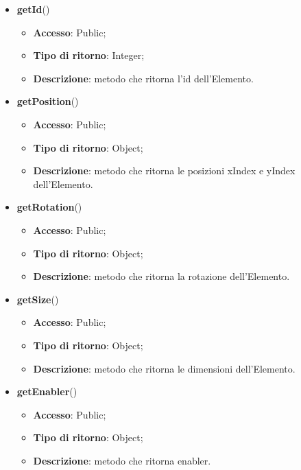 {{{\begin{itemize}
\begin{itemize}
				\item \textbf{Tipo di ritorno}: Void;
				\item \textbf{Descrizione}: metodo che ritorna executed.
			\end{itemize}
			\item \textbf{getId}()
			\begin{itemize}
				\item \textbf{Accesso}: Public;
				\item \textbf{Tipo di ritorno}: Integer;
				\item \textbf{Descrizione}: metodo che ritorna l'id dell'Elemento.
			\end{itemize}
			\item \textbf{getPosition}()
			\begin{itemize}
				\item \textbf{Accesso}: Public;
				\item \textbf{Tipo di ritorno}: Object;
				\item \textbf{Descrizione}: metodo che ritorna le posizioni xIndex e yIndex dell'Elemento.
			\end{itemize}
			\item \textbf{getRotation}()
			\begin{itemize}
				\item \textbf{Accesso}: Public;
				\item \textbf{Tipo di ritorno}: Object;
				\item \textbf{Descrizione}: metodo che ritorna la rotazione dell'Elemento.
			\end{itemize}
			\item \textbf{getSize}()
			\begin{itemize}
				\item \textbf{Accesso}: Public;
				\item \textbf{Tipo di ritorno}: Object;
				\item \textbf{Descrizione}: metodo che ritorna le dimensioni dell'Elemento.
			\end{itemize}
			\item \textbf{getEnabler}()
			\begin{itemize}
				\item \textbf{Accesso}: Public;
				\item \textbf{Tipo di ritorno}: Object;
				\item \textbf{Descrizione}: metodo che ritorna enabler.
			\end{itemize}
		\end{itemize}
}}}
